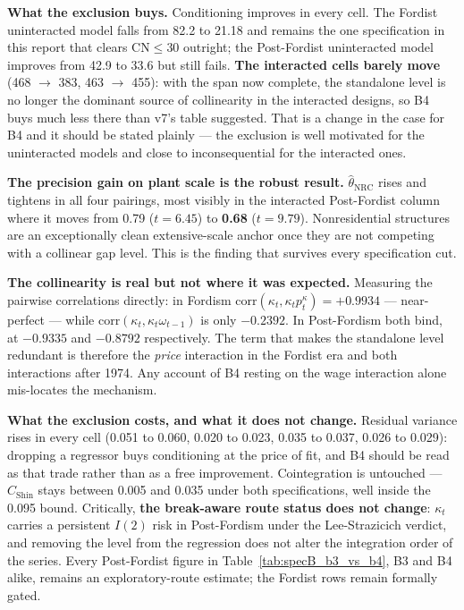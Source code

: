 \documentclass[11pt,a4paper]{article}
\begin{document}
\textbf{What the exclusion buys.} Conditioning improves in every cell. The Fordist uninteracted model falls from 82.2 to 21.18 and remains the one specification in this report that clears $\text{CN} \le 30$ outright; the Post-Fordist uninteracted model improves from 42.9 to 33.6 but still fails. \textbf{The interacted cells barely move} (468 $\to$ 383, 463 $\to$ 455): with the span now complete, the standalone level is no longer the dominant source of collinearity in the interacted designs, so B4 buys much less there than v7's table suggested. That is a change in the case for B4 and it should be stated plainly --- the exclusion is well motivated for the uninteracted models and close to inconsequential for the interacted ones.

\textbf{The precision gain on plant scale is the robust result.} $\hat{\theta}_{\text{NRC}}$ rises and tightens in all four pairings, most visibly in the interacted Post-Fordist column where it moves from 0.79 ($t = 6.45$) to \textbf{0.68} ($t = 9.79$). Nonresidential structures are an exceptionally clean extensive-scale anchor once they are not competing with a collinear gap level. This is the finding that survives every specification cut.

\textbf{The collinearity is real but not where it was expected.} Measuring the pairwise correlations directly: in Fordism $\text{corr}(\kappa_t, \kappa_t p_t^{\kappa}) = +0.9934$ --- near-perfect --- while $\text{corr}(\kappa_t, \kappa_t \omega_{t-1})$ is only $-0.2392$. In Post-Fordism both bind, at $-0.9335$ and $-0.8792$ respectively. The term that makes the standalone level redundant is therefore the \textit{price} interaction in the Fordist era and both interactions after 1974. Any account of B4 resting on the wage interaction alone mis-locates the mechanism.

\textbf{What the exclusion costs, and what it does not change.} Residual variance rises in every cell (0.051 to 0.060, 0.020 to 0.023, 0.035 to 0.037, 0.026 to 0.029): dropping a regressor buys conditioning at the price of fit, and B4 should be read as that trade rather than as a free improvement. Cointegration is untouched --- $C_{\text{Shin}}$ stays between 0.005 and 0.035 under both specifications, well inside the 0.095 bound. Critically, \textbf{the break-aware route status does not change}: $\kappa_t$ carries a persistent $I(2)$ risk in Post-Fordism under the Lee-Strazicich verdict, and removing the level from the regression does not alter the integration order of the series. Every Post-Fordist figure in Table~\ref{tab:specB_b3_vs_b4}, B3 and B4 alike, remains an exploratory-route estimate; the Fordist rows remain formally gated.
\end{document}
